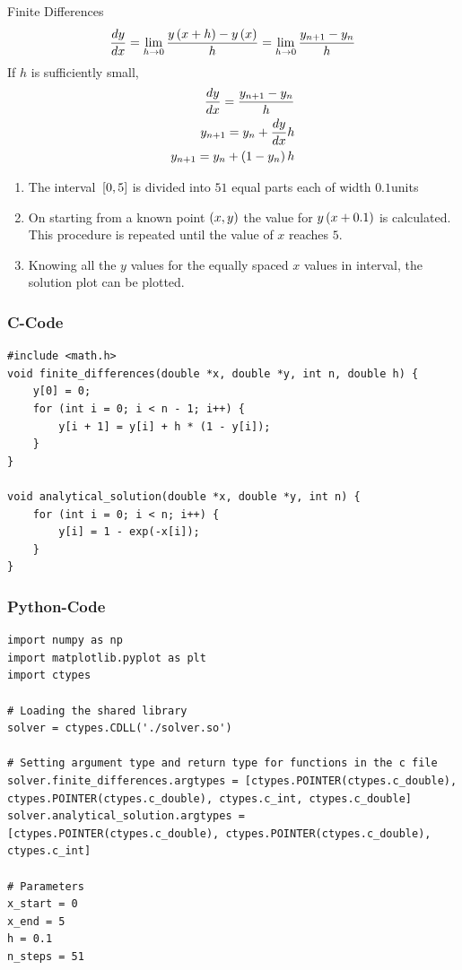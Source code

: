 \documentclass{beamer}
\begin{document}
\begin{frame}{Finite Differences}
\begin{align*}
\frac{dy}{dx}=\lim_{h \rightarrow 0} \frac{y\left(x+h\right)-y\left(x\right)}{h}
=\lim_{h \rightarrow 0}\frac{{}y_{n+1}-y_{n}}{h}
\end{align*}
If $h$ is sufficiently small,
\begin{align*}
  \frac{dy}{dx}=\frac{{}y_{n+1}-y_{n}}{h}\\
  y_{n+1}=y_{n}+\frac{dy}{dx}h\\
  y_{n+1}=y_{n}+\left(1-y_{n}\right)h\\
\end{align*}
\begin{enumerate}
    \item The interval ${}\left[0,5\right]$ is divided  into $51$ equal parts each of width $0.1$units
    \item On starting from a known point $\left(x,y\right)$ the value for $y\left(x+0.1\right)$ is calculated. This procedure is repeated until the value of $x$ reaches $5$.
    \item Knowing all the $y$ values for the equally spaced $x$ values in interval, the solution plot can be plotted.
\end{enumerate}
    
\end{frame}
\begin{frame}[fragile]
\frametitle{C-Code}
\begin{verbatim}
#include <math.h>
void finite_differences(double *x, double *y, int n, double h) {
    y[0] = 0; 
    for (int i = 0; i < n - 1; i++) {
        y[i + 1] = y[i] + h * (1 - y[i]);
    }
}

void analytical_solution(double *x, double *y, int n) {
    for (int i = 0; i < n; i++) {
        y[i] = 1 - exp(-x[i]);
    }
}
\end{verbatim}
\end{frame}
\begin{frame}[fragile]
  \frametitle{Python-Code}

\begin{verbatim}
import numpy as np
import matplotlib.pyplot as plt
import ctypes

# Loading the shared library
solver = ctypes.CDLL('./solver.so')

# Setting argument type and return type for functions in the c file 
solver.finite_differences.argtypes = [ctypes.POINTER(ctypes.c_double), ctypes.POINTER(ctypes.c_double), ctypes.c_int, ctypes.c_double]
solver.analytical_solution.argtypes = [ctypes.POINTER(ctypes.c_double), ctypes.POINTER(ctypes.c_double), ctypes.c_int]

# Parameters
x_start = 0
x_end = 5
h = 0.1
n_steps = 51
\end{verbatim}
\end{frame}
\end{document}

